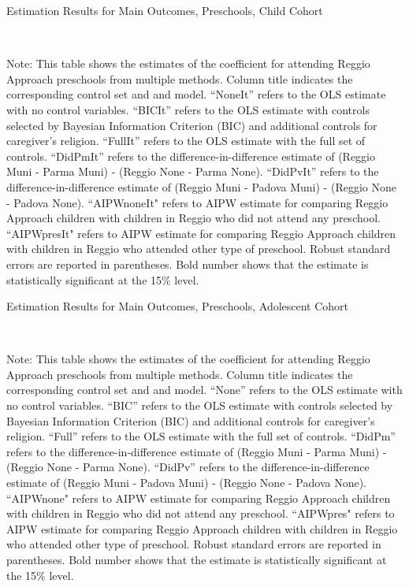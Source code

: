 \begin{landscape}

\begin{table}[H] \caption{Estimation Results for Main Outcomes, Preschools, Child Cohort} \label{ols-M-child-reg}
\scalebox{0.9}{}
\vspace{1ex} \\
\footnotesize\raggedright{Note: This table shows the estimates of the coefficient for attending Reggio Approach preschools from multiple methods. Column title indicates the corresponding control set and and model. ``NoneIt'' refers to the OLS estimate with no control variables. ``BICIt'' refers to the OLS estimate with controls selected by Bayesian Information Criterion (BIC) and additional controls for caregiver's religion. ``FullIt'' refers to the OLS estimate with the full set of controls. ``DidPmIt'' refers to the difference-in-difference estimate of (Reggio Muni - Parma Muni) - (Reggio None - Parma None). ``DidPvIt'' refers to the difference-in-difference estimate of (Reggio Muni - Padova Muni) - (Reggio None - Padova None).  ``AIPWnoneIt" refers to AIPW estimate for comparing Reggio Approach children with children in Reggio who did not attend any preschool. ``AIPWpresIt" refers to AIPW estimate for comparing Reggio Approach children with children in Reggio who attended other type of preschool. Robust standard errors are reported in parentheses. Bold number shows that the estimate is statistically significant at the 15\% level.}

\end{table}

\begin{table}[H] \caption{Estimation Results for Main Outcomes, Preschools, Adolescent Cohort} \label{ols-M-adol-reg}
\scalebox{0.9}{}
\vspace{1ex} \\
\footnotesize\raggedright{Note: This table shows the estimates of the coefficient for attending Reggio Approach preschools from multiple methods. Column title indicates the corresponding control set and and model. ``None'' refers to the OLS estimate with no control variables. ``BIC'' refers to the OLS estimate with controls selected by Bayesian Information Criterion (BIC) and additional controls for caregiver's religion. ``Full'' refers to the OLS estimate with the full set of controls. ``DidPm'' refers to the difference-in-difference estimate of (Reggio Muni - Parma Muni) - (Reggio None - Parma None). ``DidPv'' refers to the difference-in-difference estimate of (Reggio Muni - Padova Muni) - (Reggio None - Padova None).  ``AIPWnone" refers to AIPW estimate for comparing Reggio Approach children with children in Reggio who did not attend any preschool. ``AIPWpres" refers to AIPW estimate for comparing Reggio Approach children with children in Reggio who attended other type of preschool. Robust standard errors are reported in parentheses. Bold number shows that the estimate is statistically significant at the 15\% level.}
\end{table}



\end{landscape}
